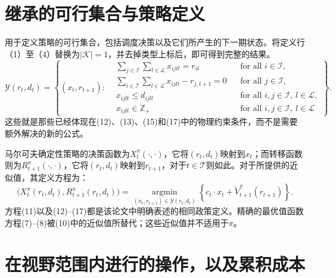 \documentclass{article}
\begin{document}
\section*{继承的可行集合与策略定义}

用于定义策略的可行集合，包括调度决策以及它们所产生的下一期状态。将定义行（1）至（4）替换为$|\mathcal K|=1$，并去掉类型上标后，即可得到完整的结果。
\begin{equation}
\mathcal Y(r_t,d_t)=
\left\{(x_t,r_{t+1}):
\begin{aligned}
&\sum_{j\in\mathcal I}\sum_{l\in\mathcal L}x_{ijlt}=r_{it}
&&\text{for all }i\in\mathcal I,\\
&\sum_{i\in\mathcal I}\sum_{l\in\mathcal L}x_{ijlt}-r_{j,t+1}=0
&&\text{for all }j\in\mathcal I,\\
&x_{ijlt}\leq d_{ijlt}
&&\text{for all }i,j\in\mathcal I,\ l\in\mathcal L,\\
&x_{ijlt}\in\mathbb Z_+
&&\text{for all }i,j\in\mathcal I,\ l\in\mathcal L
\end{aligned}
\right\}.
\tag{1--4, single type}
\end{equation}
这些就是那些已经体现在(12)、(13)、(15)和(17)中的物理约束条件，而不是需要额外解决的新的公式。

马尔可夫确定性策略的决策函数为$X_t^\pi(\cdot,\cdot)$，它将$(r_t,d_t)$映射到$x_t$；而转移函数则为$R_{t+1}^\pi(\cdot,\cdot)$，它将$(r_t,d_t)$映射到$r_{t+1}$，对于$t\in\mathcal T$则如此。对于所提供的近似值，其定义方程为：
\begin{equation}
\bigl(X_t^\pi(r_t,d_t),R_{t+1}^\pi(r_t,d_t)\bigr)
=\operatorname*{argmin}_{(x_t,r_{t+1})\in\mathcal Y(r_t,d_t)}
\left\{c_t\cdot x_t+\tilde V^\pi_{t+1}(r_{t+1})\right\}.
\tag{10}
\end{equation}
方程(11)以及(12)--(17)都是该论文中明确表述的相同政策定义。精确的最优值函数方程(7)--(8)被(10)中的近似值所替代；这些近似值并不适用于$\pi$。

\section*{在视野范围内进行的操作，以及累积成本}
\end{document}
